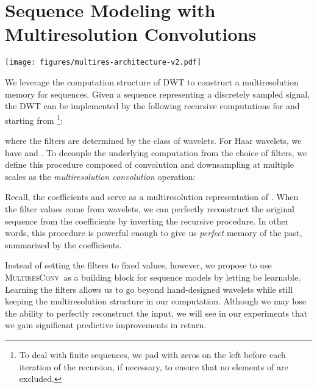 \documentclass{article}
\theoremstyle{plain}
\theoremstyle{definition}
\theoremstyle{remark}
\newcommand{\ourlayer}{\textsc{MultiresLayer}}
\newcommand{\treeblock}{\textsc{MultiresBlock}}
\newcommand{\ourconv}{\textsc{MultiresConv}}
\begin{document}
\section{Sequence Modeling with Multiresolution Convolutions}
\label{sec:multiresnet}
\begin{figure*}[t]
\texttt{[image: figures/multires-architecture-v2.pdf]}
\centering
\vspace{-4mm}
\caption{(Left) \ourconv\ consists of a sequence of dilated convolutions that share the same filters  across all levels. Here we illustrate \textsc{TreeSelect} with the ``resolution fading'' strategy of keeping the right-most coefficient at each level of , 
as indicated by magenta outlines. 
(Right) A schematic of our \treeblock\ architecture. Each channel of the input sequence is processed independently in the \ourlayer. 
The 1x1 convolution mixes the information across channels. 
We stack multiple \treeblock s\  to build our deep sequence models.} \vspace{-4mm}
\label{fig:multires-architecture}
\end{figure*}
We leverage the computation structure of DWT to construct a multiresolution memory for sequences. 
Given a sequence  representing a discretely sampled signal, the DWT can be implemented by the following recursive computations for  and  starting from \footnote{To deal with finite sequences, we pad  with zeros on the left before each iteration of the recursion, if necessary, to ensure that no elements of  are excluded. }:

where the filters  are determined by the class of wavelets. 
For Haar wavelets, we have  and . 
To decouple the underlying computation from the choice of filters, 
we define this procedure composed of convolution and downsampling at multiple scales as the \emph{multiresolution convolution} operation:

Recall, the coefficients  and  
serve as a multiresolution representation of .  When the filter values come from wavelets, we can perfectly reconstruct the original sequence  from the coefficients  by inverting the recursive procedure.
In other words, this procedure is powerful enough to give us \emph{perfect} memory of the past, summarized by the coefficients.

Instead of setting the filters to fixed values, however, we propose to use \ourconv\ as a building block for sequence models by letting  be learnable.
Learning the filters allows us to go beyond hand-designed wavelets while still keeping the multiresolution structure in our computation. 
Although we may lose the ability to perfectly reconstruct the input, we will see in our experiments that we gain significant predictive improvements in return.
\end{document}
